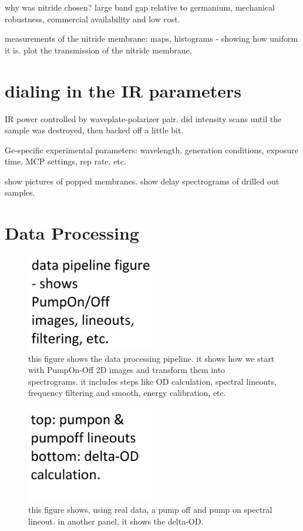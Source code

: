 why was nitride chosen? large band gap relative to germanium, mechanical robustness, commercial availability and low cost.

measurements of the nitride membrane: maps, histograms - showing how uniform it is. plot the transmission of the nitride membrane.


\section{dialing in the IR parameters}
IR power controlled by waveplate-polarizer pair. did intensity scans until the sample was destroyed, then backed off a little bit.


Ge-specific experimental parameters: wavelength, generation conditions, exposure time, MCP settings, rep rate, etc.

show pictures of popped membranes. show delay spectrograms of drilled out samples.


\section{Data Processing}

\begin{figure}
	\centering
	\includegraphics[width=0.5\textwidth]{figures/chap3/Data_Pipeline.png}
	\caption{this figure shows the data processing pipeline. it shows how we start with PumpOn-Off 2D images and transform them into spectrograms. it includes steps like OD calculation, spectral lineouts, frequency filtering and smooth, energy calibration, etc.}
	\label{fig:Data_Pipeline}
\end{figure}

\begin{figure}
	\centering
	\includegraphics[width=0.5\textwidth]{figures/chap3/PumpOn_vs_PumpOff.png}
	\caption{this figure shows, using real data, a pump off and pump on spectral lineout. in another panel, it shows the delta-OD.}
	\label{fig:PumpOn_vs_PumpOff}
\end{figure}

